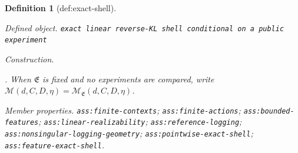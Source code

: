 \documentclass{article}
\newtheorem{definition}{Definition}
\begin{document}
\begin{definition}[def:exact-shell]\label{def:exact-shell}
\par\smallskip\noindent\emph{Defined object.} \texttt{exact linear reverse-\allowbreak{}KL shell conditional on a public experiment}
\par\smallskip\noindent\emph{Construction.} \par\noindent {}\par\noindent. When \(\mathfrak E\) is fixed and no experiments are compared, write \(\mathcal M(d,C,D,\eta)=\mathcal M_{\mathfrak E}(d,C,D,\eta)\).
\par\smallskip\noindent\emph{Member properties.} \texttt{ass:\allowbreak{}finite-\allowbreak{}contexts}; \texttt{ass:\allowbreak{}finite-\allowbreak{}actions}; \texttt{ass:\allowbreak{}bounded-\allowbreak{}features}; \texttt{ass:\allowbreak{}linear-\allowbreak{}realizability}; \texttt{ass:\allowbreak{}reference-\allowbreak{}logging}; \texttt{ass:\allowbreak{}nonsingular-\allowbreak{}logging-\allowbreak{}geometry}; \texttt{ass:\allowbreak{}pointwise-\allowbreak{}exact-\allowbreak{}shell}; \texttt{ass:\allowbreak{}feature-\allowbreak{}exact-\allowbreak{}shell}.
\end{definition}
\end{document}
